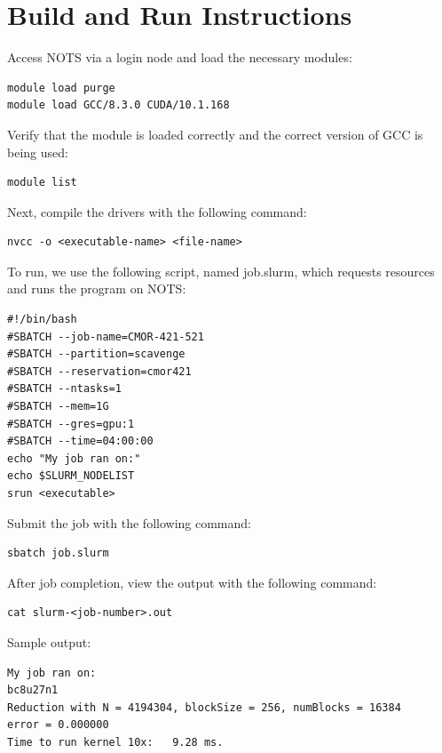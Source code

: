 \documentclass{article}
\begin{document}
\section*{Build and Run Instructions}
Access NOTS via a login node and load the necessary modules:
\begin{verbatim}
module load purge
module load GCC/8.3.0 CUDA/10.1.168
\end{verbatim}
Verify that the module is loaded correctly and the correct version of GCC is being used:
\begin{verbatim}
module list
\end{verbatim}
Next, compile the drivers with the following command:
\begin{verbatim}
nvcc -o <executable-name> <file-name>
\end{verbatim}
To run, we use the following script, named job.slurm, which requests resources and runs the program on NOTS:
\begin{verbatim}
#!/bin/bash
#SBATCH --job-name=CMOR-421-521
#SBATCH --partition=scavenge
#SBATCH --reservation=cmor421
#SBATCH --ntasks=1
#SBATCH --mem=1G
#SBATCH --gres=gpu:1
#SBATCH --time=04:00:00
echo "My job ran on:"
echo $SLURM_NODELIST
srun <executable>
\end{verbatim}
Submit the job with the following command:
\begin{verbatim}
sbatch job.slurm
\end{verbatim}
After job completion, view the output with the following command:
\begin{verbatim}
cat slurm-<job-number>.out
\end{verbatim}
Sample output:
\begin{verbatim}
My job ran on:
bc8u27n1
Reduction with N = 4194304, blockSize = 256, numBlocks = 16384
error = 0.000000
Time to run kernel 10x:   9.28 ms.
\end{verbatim}
\end{document}
